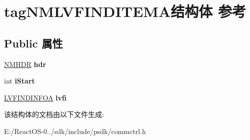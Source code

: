 \hypertarget{structtag_n_m_l_v_f_i_n_d_i_t_e_m_a}{}\section{tag\+N\+M\+L\+V\+F\+I\+N\+D\+I\+T\+E\+M\+A结构体 参考}
\label{structtag_n_m_l_v_f_i_n_d_i_t_e_m_a}
\subsection*{Public 属性}
\begin{DoxyCompactItemize}
\item 
\mbox{\label{structtag_n_m_l_v_f_i_n_d_i_t_e_m_a_ad233b2751dd21f7ec22b2d695186d1da}} 
\hyperlink{structtag_n_m_h_d_r}{N\+M\+H\+DR} {\bfseries hdr}
\item 
\mbox{\label{structtag_n_m_l_v_f_i_n_d_i_t_e_m_a_a4e8708a1377b16b107e8ead100d70cbf}} 
int {\bfseries i\+Start}
\item 
\mbox{\label{structtag_n_m_l_v_f_i_n_d_i_t_e_m_a_ab1c48fa13f5c2f330081de7ae6d69c38}} 
\hyperlink{structtag_l_v_f_i_n_d_i_n_f_o_a}{L\+V\+F\+I\+N\+D\+I\+N\+F\+OA} {\bfseries lvfi}
\end{DoxyCompactItemize}


该结构体的文档由以下文件生成\+:\begin{DoxyCompactItemize}
\item 
E\+:/\+React\+O\+S-\/0../sdk/include/psdk/commctrl.\+h\end{DoxyCompactItemize}
